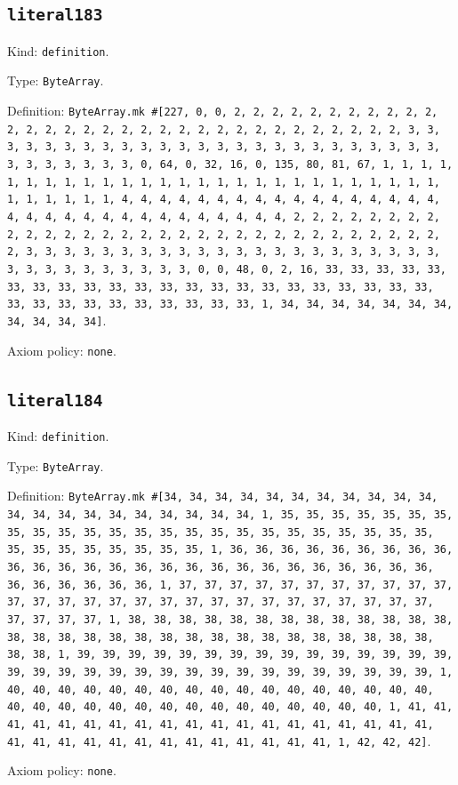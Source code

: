 \documentclass[11pt]{article}
\begin{document}
\subsection*{\texttt{literal183}}
\noindent Kind: \texttt{definition}.\par
\noindent Type: \texttt{ByteArray}.\par
\noindent Definition: \texttt{ByteArray.mk \#[227, 0, 0, 2, 2, 2, 2, 2, 2, 2, 2, 2, 2, 2, 2, 2, 2, 2, 2, 2, 2, 2, 2, 2, 2, 2, 2, 2, 2, 2, 2, 2, 2, 2, 2, 3, 3, 3, 3, 3, 3, 3, 3, 3, 3, 3, 3, 3, 3, 3, 3, 3, 3, 3, 3, 3, 3, 3, 3, 3, 3, 3, 3, 3, 3, 3, 3, 0, 64, 0, 32, 16, 0, 135, 80, 81, 67, 1, 1, 1, 1, 1, 1, 1, 1, 1, 1, 1, 1, 1, 1, 1, 1, 1, 1, 1, 1, 1, 1, 1, 1, 1, 1, 1, 1, 1, 1, 1, 1, 1, 4, 4, 4, 4, 4, 4, 4, 4, 4, 4, 4, 4, 4, 4, 4, 4, 4, 4, 4, 4, 4, 4, 4, 4, 4, 4, 4, 4, 4, 4, 4, 4, 2, 2, 2, 2, 2, 2, 2, 2, 2, 2, 2, 2, 2, 2, 2, 2, 2, 2, 2, 2, 2, 2, 2, 2, 2, 2, 2, 2, 2, 2, 2, 2, 3, 3, 3, 3, 3, 3, 3, 3, 3, 3, 3, 3, 3, 3, 3, 3, 3, 3, 3, 3, 3, 3, 3, 3, 3, 3, 3, 3, 3, 3, 3, 3, 0, 0, 48, 0, 2, 16, 33, 33, 33, 33, 33, 33, 33, 33, 33, 33, 33, 33, 33, 33, 33, 33, 33, 33, 33, 33, 33, 33, 33, 33, 33, 33, 33, 33, 33, 33, 33, 33, 1, 34, 34, 34, 34, 34, 34, 34, 34, 34, 34, 34]}.\par
\noindent Axiom policy: \texttt{none}.\par
\subsection*{\texttt{literal184}}
\noindent Kind: \texttt{definition}.\par
\noindent Type: \texttt{ByteArray}.\par
\noindent Definition: \texttt{ByteArray.mk \#[34, 34, 34, 34, 34, 34, 34, 34, 34, 34, 34, 34, 34, 34, 34, 34, 34, 34, 34, 34, 34, 1, 35, 35, 35, 35, 35, 35, 35, 35, 35, 35, 35, 35, 35, 35, 35, 35, 35, 35, 35, 35, 35, 35, 35, 35, 35, 35, 35, 35, 35, 35, 35, 35, 1, 36, 36, 36, 36, 36, 36, 36, 36, 36, 36, 36, 36, 36, 36, 36, 36, 36, 36, 36, 36, 36, 36, 36, 36, 36, 36, 36, 36, 36, 36, 36, 36, 1, 37, 37, 37, 37, 37, 37, 37, 37, 37, 37, 37, 37, 37, 37, 37, 37, 37, 37, 37, 37, 37, 37, 37, 37, 37, 37, 37, 37, 37, 37, 37, 37, 1, 38, 38, 38, 38, 38, 38, 38, 38, 38, 38, 38, 38, 38, 38, 38, 38, 38, 38, 38, 38, 38, 38, 38, 38, 38, 38, 38, 38, 38, 38, 38, 38, 1, 39, 39, 39, 39, 39, 39, 39, 39, 39, 39, 39, 39, 39, 39, 39, 39, 39, 39, 39, 39, 39, 39, 39, 39, 39, 39, 39, 39, 39, 39, 39, 39, 1, 40, 40, 40, 40, 40, 40, 40, 40, 40, 40, 40, 40, 40, 40, 40, 40, 40, 40, 40, 40, 40, 40, 40, 40, 40, 40, 40, 40, 40, 40, 40, 40, 1, 41, 41, 41, 41, 41, 41, 41, 41, 41, 41, 41, 41, 41, 41, 41, 41, 41, 41, 41, 41, 41, 41, 41, 41, 41, 41, 41, 41, 41, 41, 41, 41, 1, 42, 42, 42]}.\par
\noindent Axiom policy: \texttt{none}.\par
\end{document}

